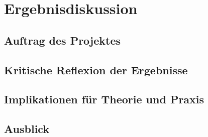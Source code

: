 \chapter{Ergebnisdiskussion}
\section{Auftrag des Projektes}
\section{Kritische Reflexion der Ergebnisse}
\section{Implikationen für Theorie und Praxis}
\section{Ausblick}
